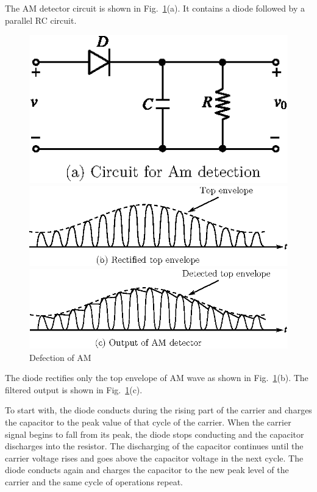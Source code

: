 The AM detector circuit is shown in Fig.~\ref{fig9.7}(a). It contains a diode followed by a parallel RC circuit.
\begin{figure}[H]
\centering
\includegraphics{chap9/fig8.7a.eps}

\medskip
\includegraphics{chap9/fig8.7b.eps}

\medskip
\includegraphics{chap9/fig8.7c.eps}

\smallskip
\caption{Defection of AM}\label{fig9.7}
\end{figure}

The diode rectifies only the top envelope of AM wave as shown in Fig.~\ref{fig9.7}(b). The filtered output is shown in Fig.~\ref{fig9.7}(c). 

To start with, the diode conducts during the rising part of the carrier and charges the capacitor to the peak value of that cycle of the carrier. When the carrier signal begins to fall from its peak, the diode stops conducting and the capacitor discharges into the resistor. The discharging of the capacitor continues until the carrier voltage rises and goes above the capacitor voltage in the next cycle. The diode conducts again and charges the capacitor to the new peak level of the carrier and the same cycle of operations repeat.

